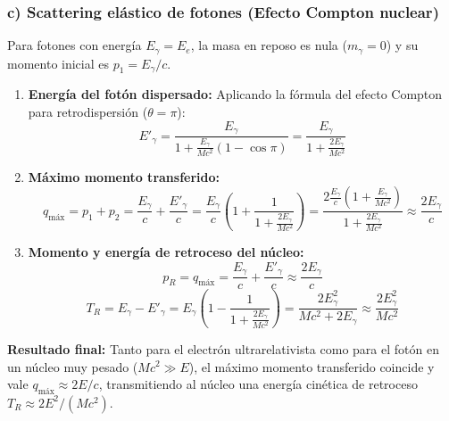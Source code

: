 \begin{problema}
\subsubsection*{c) Scattering elástico de fotones (Efecto Compton nuclear)}

Para fotones con energía $E_\gamma = E_e$, la masa en reposo es nula ($m_\gamma = 0$) y su momento inicial es $p_1 = E_\gamma / c$.

\begin{enumerate}[label=\arabic*.]
    \item \textbf{Energía del fotón dispersado:} Aplicando la fórmula del efecto Compton para retrodispersión ($\theta = \pi$):
    \begin{equation*}
    E'_\gamma = \frac{E_\gamma}{1 + \frac{E_\gamma}{M c^2}(1 - \cos\pi)} = \frac{E_\gamma}{1 + \frac{2 E_\gamma}{M c^2}}
    \end{equation*}

    \item \textbf{Máximo momento transferido:}
    \begin{equation*}
    q_{\text{máx}} = p_1 + p_2 = \frac{E_\gamma}{c} + \frac{E'_\gamma}{c} = \frac{E_\gamma}{c} \left( 1 + \frac{1}{1 + \frac{2 E_\gamma}{M c^2}} \right) = \frac{2 \frac{E_\gamma}{c} \left(1 + \frac{E_\gamma}{M c^2}\right)}{1 + \frac{2 E_\gamma}{M c^2}} \approx \frac{2 E_\gamma}{c}
    \end{equation*}

    \item \textbf{Momento y energía de retroceso del núcleo:}
    \begin{equation*}
    p_R = q_{\text{máx}} = \frac{E_\gamma}{c} + \frac{E'_\gamma}{c} \approx \frac{2 E_\gamma}{c}
    \end{equation*}
    \begin{equation*}
    T_R = E_\gamma - E'_\gamma = E_\gamma \left( 1 - \frac{1}{1 + \frac{2 E_\gamma}{M c^2}} \right) = \frac{2 E_\gamma^2}{M c^2 + 2 E_\gamma} \approx \frac{2 E_\gamma^2}{M c^2}
    \end{equation*}
\end{enumerate}

\textbf{Resultado final:} Tanto para el electrón ultrarelativista como para el fotón en un núcleo muy pesado ($M c^2 \gg E$), el máximo momento transferido coincide y vale $q_{\text{máx}} \approx 2E/c$, transmitiendo al núcleo una energía cinética de retroceso $T_R \approx 2E^2 / (M c^2)$.
\end{problema}

